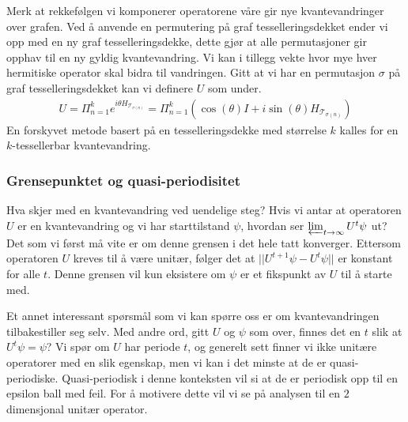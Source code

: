         Merk at rekkefølgen vi komponerer operatorene våre gir nye kvantevandringer over grafen. Ved å anvende en permutering på graf tesselleringsdekket ender vi opp med en ny graf tesselleringsdekke, dette gjør at alle permutasjoner gir opphav til en ny gyldig kvantevandring. Vi kan i tillegg vekte hvor mye hver hermitiske operator skal bidra til vandringen. Gitt at vi har en permutasjon $\sigma$ på graf tesselleringsdekket kan vi definere $U$ som under.
        \begin{align*}
            U=\Pi_{n=1}^ke^{i\theta H_{\mathcal{T}_{\sigma(n)}}}=\Pi_{n=1}^k(\cos(\theta)I+i\sin(\theta)H_{\mathcal{T}_{\sigma(n)}})
        \end{align*}
        En forskyvet metode basert på en tesselleringsdekke med størrelse $k$ kalles for en $k$-tessellerbar kvantevandring.

    \subsubsection{Grensepunktet og quasi-periodisitet}

        Hva skjer med en kvantevandring ved uendelige steg? Hvis vi antar at operatoren $U$ er en kvantevandring og vi har starttilstand $\psi$, hvordan ser $\varprojlim_{t\rightarrow\infty}U^t\psi$ ut? Det som vi først må vite er om denne grensen i det hele tatt konverger. Ettersom operatoren $U$ kreves til å være unitær, følger det at $||U^{t+1}\psi - U^t\psi||$ er konstant for alle $t$. Denne grensen vil kun eksistere om $\psi$ er et fikspunkt av $U$ til å starte med.

        Et annet interessant spørsmål som vi kan spørre oss er om kvantevandringen tilbakestiller seg selv. Med andre ord, gitt $U$ og $\psi$ som over, finnes det en $t$ slik at $U^t\psi = \psi$? Vi spør om $U$ har periode $t$, og generelt sett finner vi ikke unitære operatorer med en slik egenskap, men vi kan i det minste at de er quasi-periodiske. Quasi-periodisk i denne konteksten vil si at de er periodisk opp til en epsilon ball med feil. For å motivere dette vil vi se på analysen til en $2$ dimensjonal unitær operator.

